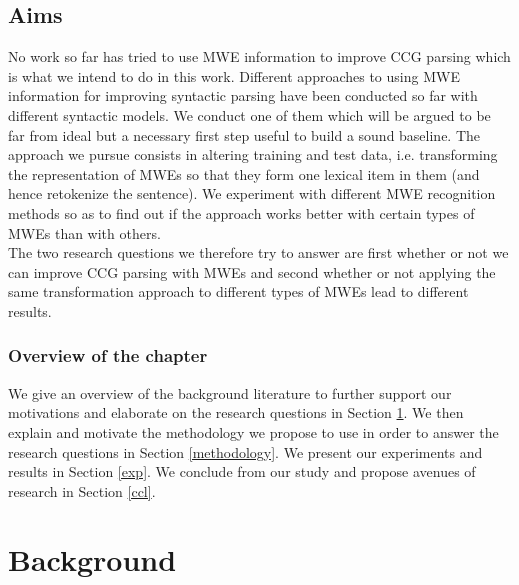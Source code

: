 \documentclass[output=paper]{LSP/langsci}
\begin{document}
\subsection{Aims}
\indent No work so far has tried to use MWE information to improve CCG parsing which is what we intend to do in this work. Different approaches to using MWE information for improving syntactic parsing have been conducted so far with different syntactic models. We conduct one of them which will be argued to be far from ideal but a necessary first step useful to build a sound baseline. The approach we pursue consists in altering training and test data, i.e. transforming the representation of MWEs so that they form one lexical item in them (and hence retokenize the sentence). We experiment with different MWE recognition methods so as to find out if the approach works better with certain types of MWEs than with others.\\
\indent The two research questions we therefore try to answer are first whether or not we can improve CCG parsing with MWEs and second whether or not applying the same transformation approach to different types of MWEs lead to different results.

\subsubsection{Overview of the chapter}
\indent We give an overview of the background literature to further support our motivations and elaborate on the research questions in Section \ref{relatedwork}. We then explain and motivate the methodology we propose to use in order to answer the research questions in Section \ref{methodology}. We present our experiments and results in Section \ref{exp}. We conclude from our study and propose avenues of research in Section \ref{ccl}.


\section{Background}
\label{relatedwork}
\end{document}
